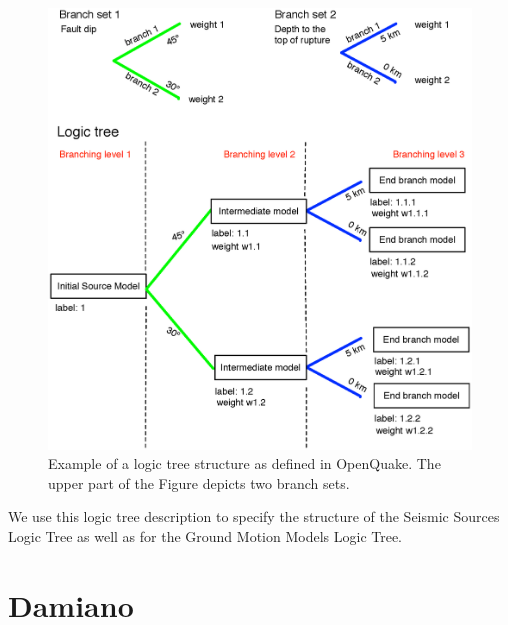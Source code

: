 %
\begin{figure}
\includegraphics[width=15cm]{./Figures/Part_Hazard/logic_tree_schema.eps}
\caption{Example of a logic tree structure as defined in OpenQuake. The upper
part of the Figure depicts two branch sets.}
\label{fig:logic_tree_schema}
\end{figure}
%
We use this logic tree description to specify the structure of the Seismic 
Sources Logic Tree as well as for the Ground Motion Models Logic Tree. 

\clearpage
\section{Damiano}
\dotfill \\
%

